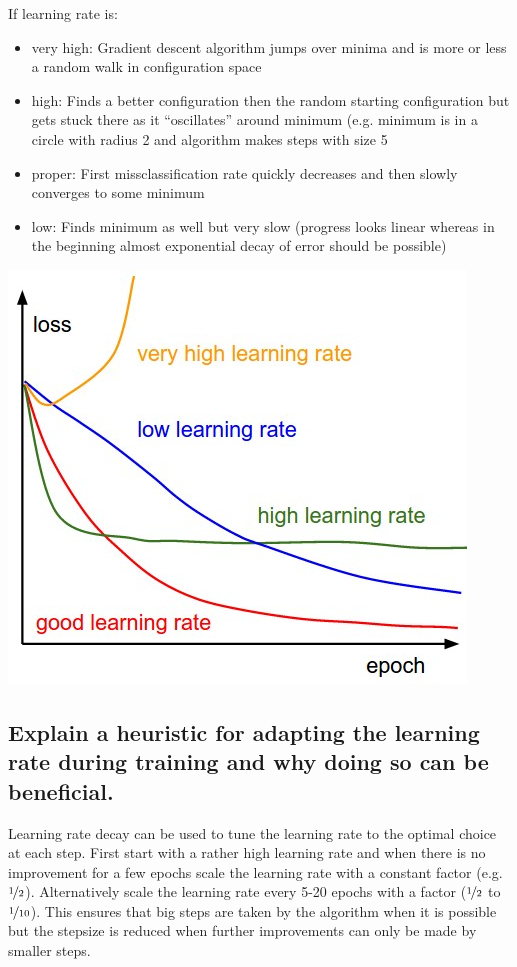 If learning rate is:
\begin{itemize}
\item very high: Gradient descent algorithm jumps over minima and is more or less a random walk in configuration space
\item high: Finds a better configuration then the random starting configuration but gets stuck there as it ``oscillates'' around minimum (e.g. minimum is in a circle with radius 2 and algorithm makes steps with size 5
\end{itemize}
\begin{minipage}{0.6\textwidth}
\begin{itemize}
\item proper: First missclassification rate quickly decreases and then slowly converges to some minimum
\item low: Finds minimum as well but very slow (progress looks linear whereas in the beginning almost exponential decay of error should be possible)
\end{itemize}
\end{minipage}\begin{minipage}{0.4\textwidth}
\hspace{0.2cm}\includegraphics[width=\textwidth]{./img/learningRates.jpeg}
\end{minipage}
\subsection{Explain a heuristic for adapting the learning rate during training and why doing so can be beneficial.}
Learning rate decay can be used to tune the learning rate to the optimal choice at each step. First start with a rather high learning rate and when there is no improvement for a few epochs scale the learning rate with a constant factor (e.g. $\nicefrac 1 2$).
Alternatively scale the learning rate every 5-20 epochs with a factor ($\nicefrac 1 2$ to $\nicefrac 1 {10}$). This ensures that big steps are taken by the algorithm when it is possible but the stepsize is reduced when further improvements can only be made by smaller steps.
%
